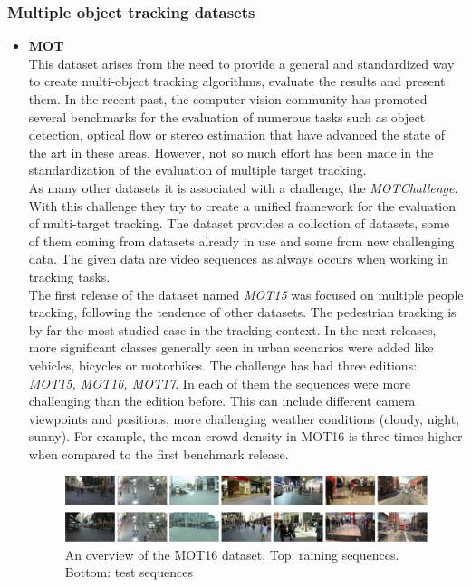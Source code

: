 \subsubsection{Multiple object tracking datasets}
\begin{itemize}
\item \textbf{MOT} ~\cite{milan2016mot16}\\
This dataset arises from the need to provide a general and standardized way to create multi-object tracking algorithms, evaluate the results and present them. In the recent past, the computer vision community has promoted several benchmarks for the evaluation of numerous tasks such as object detection, optical flow or stereo estimation that have advanced the state of the art in these areas. However, not so much effort has been made in the standardization of the evaluation of multiple target tracking.\\
As many other datasets it is associated with a challenge, the \textit{MOTChallenge}. With this challenge they try to create a unified framework for the evaluation of multi-target tracking. The dataset provides a collection of datasets, some of them coming from datasets already in use and some from new challenging data. The given data are video sequences as always occurs when working in tracking tasks.\\
The first release of the dataset named \textit{MOT15} was focused on multiple people tracking, following the tendence of other datasets. The pedestrian tracking is by far the most studied case in the tracking context. In the next releases, more significant classes generally seen in urban scenarios were added like vehicles, bicycles or motorbikes. The challenge has had three editions: \textit{MOT15, MOT16, MOT17}. In each of them the sequences were more challenging than the edition before. This can include different camera viewpoints and positions, more challenging weather conditions (cloudy, night, sunny). For example, the mean crowd density in MOT16 is three times higher when compared to the first benchmark release.
\begin{figure}[H]
\begin{center}
\includegraphics[scale=0.4]{previous_version/mot16.png}
\caption{An overview of the MOT16 dataset. Top: raining sequences. Bottom: test sequences ~\cite{milan2016mot16}}

\end{center}
\end{figure}
\end{itemize}
